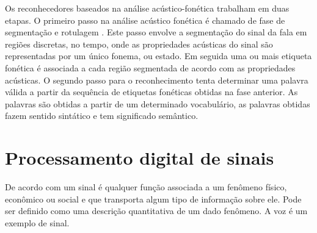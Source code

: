 Os reconhecedores baseados na análise acústico-fonética trabalham em duas etapas. O primeiro passo na análise acústico fonética é chamado de fase de segmentação e rotulagem \cite{fundRecFala}. Este passo envolve a segmentação do sinal da fala em regiões discretas, no tempo, onde as propriedades acústicas do sinal são representadas por um único fonema, ou estado. Em seguida uma ou mais etiqueta fonética é associada a cada região segmentada de acordo com as propriedades acústicas. O segundo passo para o reconhecimento tenta determinar uma palavra válida a partir da sequência de etiquetas fonéticas obtidas na fase anterior. As palavras são obtidas a partir de um determinado vocabulário, as palavras obtidas fazem sentido sintático e tem significado semântico.

\section{Processamento digital de sinais}
 
De acordo com \cite{sig} um sinal é qualquer função associada a um fenômeno físico, econômico ou social e que transporta  algum tipo de informação sobre ele. Pode ser definido como uma descrição quantitativa de um dado fenômeno. A voz é um exemplo de sinal.

